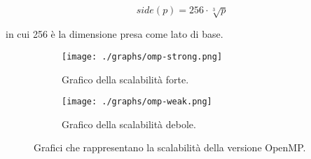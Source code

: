 \[
side(p) = 256 \cdot \sqrt[3]{p}
\]

in cui 256 è la dimensione presa come lato di base.

\begin{figure}
  \centering
  \begin{subfigure}[b]{0.49\linewidth}
  \texttt{[image: ./graphs/omp-strong.png]}
  \caption{Grafico della scalabilità forte.}\label{fig:strong1}
  \end{subfigure}
  \begin{subfigure}[b]{0.5\linewidth}
  \texttt{[image: ./graphs/omp-weak.png]}
  \caption{Grafico della scalabilità debole.}\label{fig:weak1}
  \end{subfigure}
  \caption{Grafici che rappresentano la scalabilità della versione OpenMP.}\label{fig:scaling}
\end{figure}
